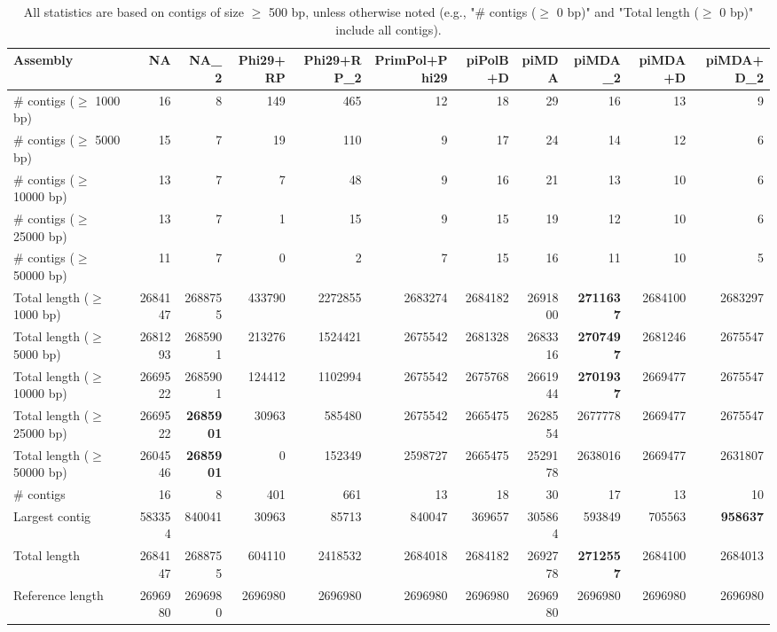 \documentclass[12pt,a4paper]{article}
\begin{document}
\begin{table}[ht]
\begin{center}
\caption{All statistics are based on contigs of size $\geq$ 500 bp, unless otherwise noted (e.g., "\# contigs ($\geq$ 0 bp)" and "Total length ($\geq$ 0 bp)" include all contigs).}
\begin{tabular}{|l*{10}{|r}|}
\hline
Assembly & NA & NA\_2 & Phi29+RP & Phi29+RP\_2 & PrimPol+Phi29 & piPolB+D & piMDA & piMDA\_2 & piMDA+D & piMDA+D\_2 \\ \hline
\# contigs ($\geq$ 1000 bp) & 16 & 8 & 149 & 465 & 12 & 18 & 29 & 16 & 13 & 9 \\ \hline
\# contigs ($\geq$ 5000 bp) & 15 & 7 & 19 & 110 & 9 & 17 & 24 & 14 & 12 & 6 \\ \hline
\# contigs ($\geq$ 10000 bp) & 13 & 7 & 7 & 48 & 9 & 16 & 21 & 13 & 10 & 6 \\ \hline
\# contigs ($\geq$ 25000 bp) & 13 & 7 & 1 & 15 & 9 & 15 & 19 & 12 & 10 & 6 \\ \hline
\# contigs ($\geq$ 50000 bp) & 11 & 7 & 0 & 2 & 7 & 15 & 16 & 11 & 10 & 5 \\ \hline
Total length ($\geq$ 1000 bp) & 2684147 & 2688755 & 433790 & 2272855 & 2683274 & 2684182 & 2691800 & {\bf 2711637} & 2684100 & 2683297 \\ \hline
Total length ($\geq$ 5000 bp) & 2681293 & 2685901 & 213276 & 1524421 & 2675542 & 2681328 & 2683316 & {\bf 2707497} & 2681246 & 2675547 \\ \hline
Total length ($\geq$ 10000 bp) & 2669522 & 2685901 & 124412 & 1102994 & 2675542 & 2675768 & 2661944 & {\bf 2701937} & 2669477 & 2675547 \\ \hline
Total length ($\geq$ 25000 bp) & 2669522 & {\bf 2685901} & 30963 & 585480 & 2675542 & 2665475 & 2628554 & 2677778 & 2669477 & 2675547 \\ \hline
Total length ($\geq$ 50000 bp) & 2604546 & {\bf 2685901} & 0 & 152349 & 2598727 & 2665475 & 2529178 & 2638016 & 2669477 & 2631807 \\ \hline
\# contigs & 16 & 8 & 401 & 661 & 13 & 18 & 30 & 17 & 13 & 10 \\ \hline
Largest contig & 583354 & 840041 & 30963 & 85713 & 840047 & 369657 & 305864 & 593849 & 705563 & {\bf 958637} \\ \hline
Total length & 2684147 & 2688755 & 604110 & 2418532 & 2684018 & 2684182 & 2692778 & {\bf 2712557} & 2684100 & 2684013 \\ \hline
Reference length & 2696980 & 2696980 & 2696980 & 2696980 & 2696980 & 2696980 & 2696980 & 2696980 & 2696980 & 2696980 \\ \hline

\end{tabular}
\end{center}
\end{table}
\end{document}
